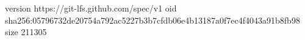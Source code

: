 version https://git-lfs.github.com/spec/v1
oid sha256:05796732de20754a792ac5227b3b7cfdb06e4b13187a0f7ec4f4043a91b8fb98
size 211305
